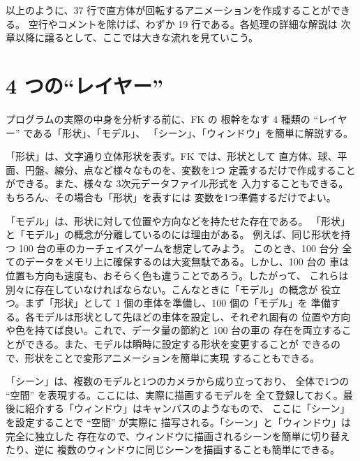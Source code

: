 ~ \\ ~ \\
以上のように、37 行で直方体が回転するアニメーションを作成することができる。
空行やコメントを除けば、わずか 19 行である。各処理の詳細な解説は
次章以降に譲るとして、ここでは大きな流れを見ていこう。

\section{4 つの``レイヤー''}
プログラムの実際の中身を分析する前に、FK の
根幹をなす 4 種類の ``レイヤー'' である「形状」、「モデル」、
「シーン」、「ウィンドウ」を簡単に解説する。

「形状」は、文字通り立体形状を表す。FK では、形状として
直方体、球、平面、円盤、線分、点など様々なものを、変数を1つ
定義するだけで作成することができる。また、様々な 3次元データファイル形式を
入力することもできる。もちろん、その場合も「形状」を表すには
変数を1つ準備するだけでよい。

「モデル」は、形状に対して位置や方向などを持たせた存在である。
「形状」と「モデル」の概念が分離しているのには理由がある。
例えば、同じ形状を持つ 100 台の車のカーチェイスゲームを想定してみよう。
このとき、100 台分
全てのデータをメモリ上に確保するのは大変無駄である。しかし、100 台の
車は位置も方向も速度も、おそらく色も違うことであろう。したがって、
これらは別々に存在していなければならない。こんなときに「モデル」の概念が
役立つ。まず「形状」として 1 個の車体を準備し、100 個の「モデル」を
準備する。各モデルは形状として先ほどの車体を設定し、それぞれ固有の
位置や方向や色を持てば良い。これで、データ量の節約と 100 台の車の
存在を両立することができる。また、モデルは瞬時に設定する形状を変更することが
できるので、形状をことで変形アニメーションを簡単に実現
することもできる。

「シーン」は、複数のモデルと1つのカメラから成り立っており、
全体で1つの ``空間'' を表現する。ここには、実際に描画するモデルを
全て登録しておく。最後に紹介する「ウィンドウ」はキャンバスのようなもので、
ここに「シーン」を設定することで ``空間'' が実際に
描写される。「シーン」と「ウィンドウ」は完全に独立した
存在なので、ウィンドウに描画されるシーンを簡単に切り替えたり、逆に
複数のウィンドウに同じシーンを描画することも簡単にできる。

